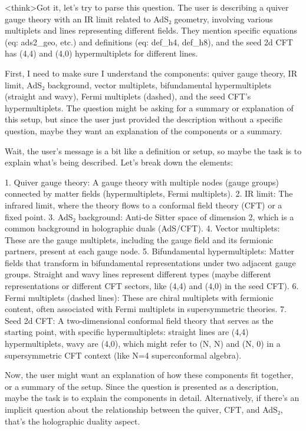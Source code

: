 <think>Got it, let's try to parse this question. The user is describing a quiver gauge theory with an IR limit related to AdS₂ geometry, involving various multiplets and lines representing different fields. They mention specific equations (eq: ads2_geo, etc.) and definitions (eq: def_h4, def_h8), and the seed 2d CFT has (4,4) and (4,0) hypermultiplets for different lines.

First, I need to make sure I understand the components: quiver gauge theory, IR limit, AdS₂ background, vector multiplets, bifundamental hypermultiplets (straight and wavy), Fermi multiplets (dashed), and the seed CFT's hypermultiplets. The question might be asking for a summary or explanation of this setup, but since the user just provided the description without a specific question, maybe they want an explanation of the components or a summary.

Wait, the user's message is a bit like a definition or setup, so maybe the task is to explain what's being described. Let's break down the elements:

1. Quiver gauge theory: A gauge theory with multiple nodes (gauge groups) connected by matter fields (hypermultiplets, Fermi multiplets).
2. IR limit: The infrared limit, where the theory flows to a conformal field theory (CFT) or a fixed point.
3. AdS₂ background: Anti-de Sitter space of dimension 2, which is a common background in holographic duals (AdS/CFT).
4. Vector multiplets: These are the gauge multiplets, including the gauge field and its fermionic partners, present at each gauge node.
5. Bifundamental hypermultiplets: Matter fields that transform in bifundamental representations under two adjacent gauge groups. Straight and wavy lines represent different types (maybe different representations or different CFT sectors, like (4,4) and (4,0) in the seed CFT).
6. Fermi multiplets (dashed lines): These are chiral multiplets with fermionic content, often associated with Fermi multiplets in supersymmetric theories.
7. Seed 2d CFT: A two-dimensional conformal field theory that serves as the starting point, with specific hypermultiplets: straight lines are (4,4) hypermultiplets, wavy are (4,0), which might refer to (N, N) and (N, 0) in a supersymmetric CFT context (like N=4 superconformal algebra).

Now, the user might want an explanation of how these components fit together, or a summary of the setup. Since the question is presented as a description, maybe the task is to explain the components in detail. Alternatively, if there's an implicit question about the relationship between the quiver, CFT, and AdS₂, that's the holographic duality aspect.

